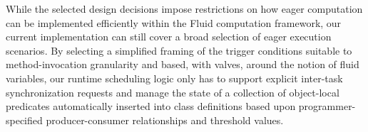 While the selected design decisions impose restrictions on how eager computation can be implemented efficiently within the Fluid computation framework, our current implementation can still cover a broad selection of eager execution scenarios. By selecting a simplified framing of the trigger conditions suitable to method-invocation granularity and based, with valves, around the notion of fluid variables, our runtime scheduling logic only has to support explicit inter-task synchronization requests and manage the state of a collection of object-local predicates automatically inserted into class definitions based upon programmer-specified producer-consumer relationships and threshold values.










